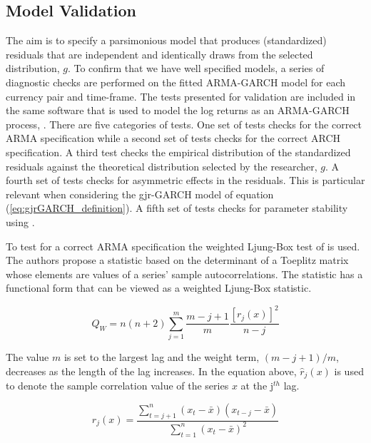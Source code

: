 \documentclass[12pt]{article}
\begin{document}
\subsection{Model Validation}

The aim is to specify a parsimonious model that produces (standardized) residuals that are independent and identically draws from the selected distribution, $g$. To confirm that we have well specified models, a series of diagnostic checks are performed on the fitted ARMA-GARCH model for each currency pair and time-frame. The tests presented for validation are included in the same software that is used to model the log returns as an ARMA-GARCH process, \cite{Rugarch}. There are five categories of tests. One set of tests checks for the correct ARMA specification while a second set of tests checks for the correct ARCH specification. A third test checks the empirical distribution of the standardized residuals against the theoretical distribution selected by the researcher, $g$. A fourth set of tests checks for asymmetric effects in the residuals. This is particular relevant when considering the gjr-GARCH model of equation (\ref{eq:gjrGARCH_definition}). A fifth set of tests checks for parameter stability using \cite{NYBLOM_1989}. 

To test for a correct ARMA specification the weighted Ljung-Box test of \cite{Fisher_Gallagher_2012} is used. The authors propose a statistic based on the determinant of a Toeplitz matrix whose elements are values of a series' sample autocorrelations. The statistic has a functional form that can be viewed as a weighted Ljung-Box statistic.

\begin{equation} \label{eq:wtd_ljung_box_arma_test}
	Q_{W} = n(n + 2) \sum_{j=1}^{m} \frac{m - j + 1}{m} \frac{[r_{j}(x)]^{2}}{n - j}
\end{equation}

The value $m$ is set to the largest lag and the weight term, $(m - j + 1) / m$, decreases as the length of the lag increases. In the equation above, $\hat{r}_{j}(x)$ is used to denote the sample correlation value of the series $x$ at the j$^{th}$ lag.

\begin{equation} \label{eq:sample_correlation}
	r_{j}(x) = \frac{\sum_{t=j+1}^{n} (x_{t} - \bar{x}) (x_{t-j} - \bar{x})}{\sum_{t=1}^{n} (x_{t} - \bar{x})^{2}}
\end{equation}
\end{document}
